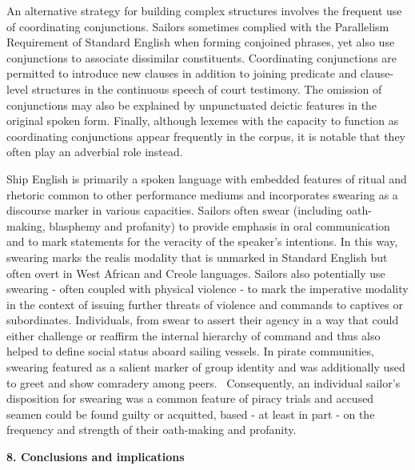 \begin{styleStandard}
An alternative strategy for building complex structures involves the frequent use of coordinating conjunctions. Sailors sometimes complied with the Parallelism Requirement of Standard English when forming conjoined phrases, yet also use conjunctions to associate dissimilar constituents. Coordinating conjunctions are permitted to introduce new clauses in addition to joining predicate and clause-level structures in the continuous speech of court testimony. The omission of conjunctions may also be explained by unpunctuated deictic features in the original spoken form. Finally, although lexemes with the capacity to function as coordinating conjunctions appear frequently in the corpus, it is notable that they often play an adverbial role instead. 
\end{styleStandard}


\begin{styleStandard}
Ship English is primarily a spoken language with embedded features of ritual and rhetoric common to other performance mediums and incorporates swearing as a discourse marker in various capacities. Sailors often swear (including oath-making, blasphemy and profanity) to provide emphasis in oral communication and to mark statements for the veracity of the speaker’s intentions. In this way, swearing marks the realis modality that is unmarked in Standard English but often overt in West African and Creole languages. Sailors also potentially use swearing - often coupled with physical violence - to mark the imperative modality in the context of issuing further threats of violence and commands to captives or subordinates. Individuals, from swear to assert their agency in a way that could either challenge or reaffirm the internal hierarchy of command and thus also helped to define social status aboard sailing vessels. In pirate communities, swearing featured as a salient marker of group identity and was additionally used to greet and show comradery among peers. \ Consequently, an individual sailor’s disposition for swearing was a common feature of piracy trials and accused seamen could be found guilty or acquitted, based - at least in part - on the frequency and strength of their oath-making and profanity. 
\end{styleStandard}


\clearpage\begin{styleStandard}
\textbf{8. Conclusions and implications}
\end{styleStandard}



